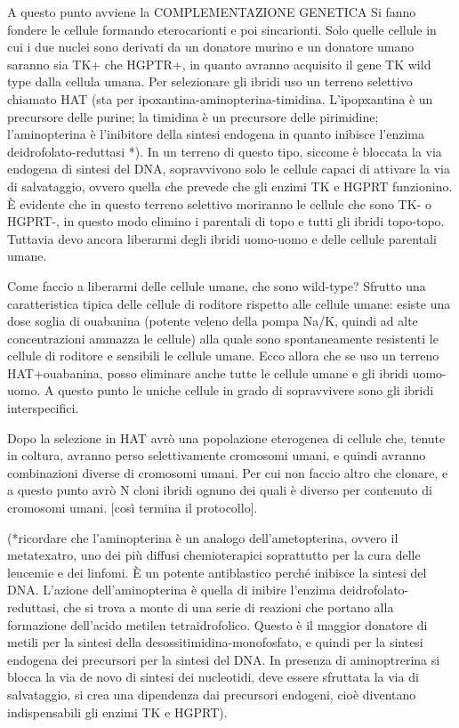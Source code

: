 \documentclass[11pt]{book}
\begin{document}
A questo punto avviene la COMPLEMENTAZIONE GENETICA
Si fanno fondere le cellule formando eterocarionti e poi sincarionti. Solo quelle cellule in cui i due nuclei sono derivati da un donatore murino e un donatore umano saranno sia TK+ che HGPTR+, in quanto avranno acquisito il gene TK wild type dalla cellula umana.
Per selezionare gli ibridi uso un terreno selettivo chiamato HAT (sta per ipoxantina-aminopterina-timidina. L’ipopxantina è un precursore delle purine; la timidina è un precursore delle pirimidine; l’aminopterina è l’inibitore della sintesi endogena in quanto inibisce l’enzima deidrofolato-reduttasi *). In un terreno di questo tipo, siccome è bloccata la via endogena di sintesi del DNA, sopravvivono solo le cellule capaci di attivare la via di salvataggio, ovvero quella che prevede che gli enzimi TK e HGPRT funzionino. È evidente che in questo terreno selettivo moriranno le cellule che sono TK- o HGPRT-, in questo modo elimino i parentali di topo e tutti gli ibridi topo-topo. Tuttavia devo ancora liberarmi degli ibridi uomo-uomo e delle cellule parentali umane.

Come faccio a liberarmi delle cellule umane, che sono wild-type?
Sfrutto una caratteristica tipica delle cellule di roditore rispetto alle cellule umane: esiste una dose soglia di ouabanina (potente veleno della pompa Na/K, quindi ad alte concentrazioni ammazza le cellule) alla quale sono spontaneamente resistenti le cellule di roditore e sensibili le cellule umane. Ecco allora che se uso un terreno HAT+ouabanina, posso eliminare anche tutte le cellule umane e gli ibridi uomo-uomo.
A questo punto le uniche cellule in grado di sopravvivere sono gli ibridi interspecifici. 

Dopo la selezione in HAT avrò una popolazione eterogenea di cellule che, tenute in coltura, avranno perso selettivamente cromosomi umani, e quindi avranno combinazioni diverse di cromosomi umani. Per cui non faccio altro che clonare, e a questo punto avrò N cloni ibridi ognuno dei quali è diverso per contenuto di cromosomi umani.
[così termina il protocollo].

(*ricordare che l’aminopterina è un analogo dell’ametopterina, ovvero il metatexatro, uno dei più diffusi chemioterapici soprattutto per la cura delle leucemie e dei linfomi. È un potente antiblastico perché inibisce la sintesi del DNA. L’azione dell’aminopterina è quella di inibire l’enzima deidrofolato-reduttasi, che si trova a monte di una serie di reazioni che portano alla formazione dell’acido metilen tetraidrofolico. Questo è il maggior donatore di metili per la sintesi della desossitimidina-monofosfato, e quindi per la sintesi endogena dei precursori per la sintesi del DNA. In presenza di aminoptrerina si blocca la via de novo di sintesi dei nucleotidi, deve essere sfruttata la via di salvataggio, si crea una dipendenza dai precursori endogeni, cioè diventano indispensabili gli enzimi TK e HGPRT).
\end{document}

